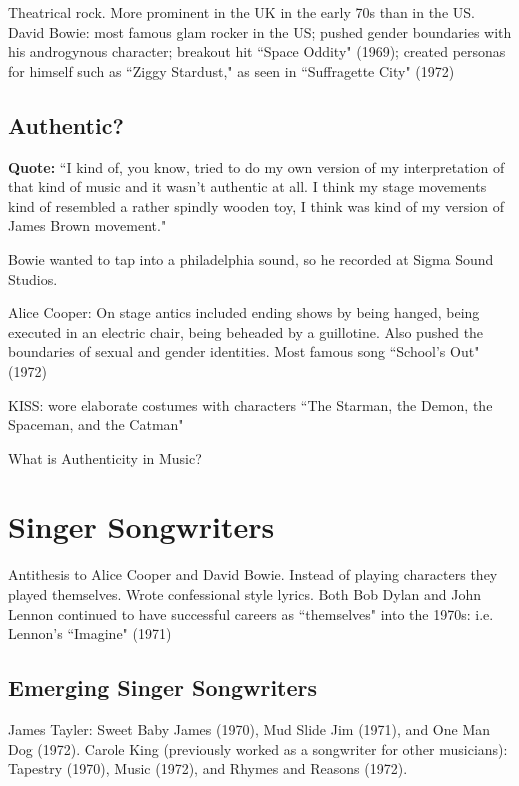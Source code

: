 \documentclass[12pt, a4paper, twoside, openright, titlepage]{book}
\begin{document}
Theatrical rock. More prominent in the UK in the early 70s than in the US. David Bowie: most famous glam rocker in the US; pushed gender boundaries with his androgynous character; breakout hit ``Space Oddity" (1969); created personas for himself such as ``Ziggy Stardust," as seen in ``Suffragette City" (1972)


\subsection{Authentic?}

\textbf{Quote:} ``I kind of, you know, tried to do my own version of my interpretation of that kind of music and it wasn't authentic at all. I think my stage movements kind of resembled a rather spindly wooden toy, I think was kind of my version of James Brown movement."

Bowie wanted to tap into a philadelphia sound, so he recorded at Sigma Sound Studios. 

Alice Cooper: On stage antics included ending shows by being hanged, being executed in an electric chair, being beheaded by a guillotine. Also pushed the boundaries of sexual and gender identities. Most famous song ``School's Out" (1972)


KISS: wore elaborate costumes with characters ``The Starman, the Demon, the Spaceman, and the Catman"

\begin{qst}{}{}
    What is Authenticity in Music?
\end{qst}

\section{Singer Songwriters}

Antithesis to Alice Cooper and David Bowie. Instead of playing characters they played themselves. Wrote confessional style lyrics. Both Bob Dylan and John Lennon continued to have successful careers as ``themselves" into the 1970s: i.e. Lennon's ``Imagine" (1971)


\subsection{Emerging Singer Songwriters}

James Tayler: Sweet Baby James (1970), Mud Slide Jim (1971), and One Man Dog (1972). Carole King (previously worked as a songwriter for other musicians): Tapestry (1970), Music (1972), and Rhymes and Reasons (1972).
\end{document}
